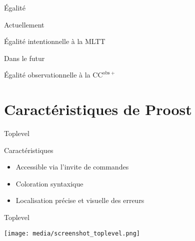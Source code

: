 \documentclass[12pt]{beamer}
\begin{document}
        \begin{frame}{Égalité}
            
            \begin{block}{Actuellement}
                
                Égalité intentionnelle à la MLTT

            \end{block} \pause

            \begin{alertblock}{Dans le futur}
                
                Égalité observationnelle à la $\mathrm{CC}^{\mathrm{obs}+}$

            \end{alertblock}

        \end{frame}

    \section{Caractéristiques de Proost}

        \begin{frame}{Toplevel}
            
            \begin{block}{Caractéristiques}
                
                \begin{itemize}
                    \item Accessible via l'invite de commandes
                    \item Coloration syntaxique
                    \item Localisation précise et visuelle des erreurs
                \end{itemize}

            \end{block} \pause

            \begin{block}{Toplevel}
                
                \begin{center}
                    \texttt{[image: media/screenshot\_toplevel.png]}
                \end{center}

            \end{block}

        \end{frame}
\end{document}
